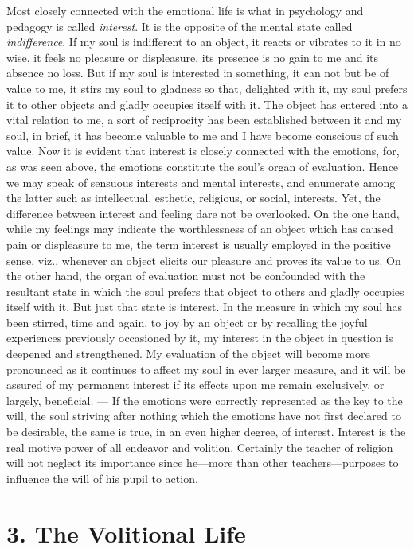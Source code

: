 Most closely connected with the emotional life is what in psychology and pedagogy is called \emph{interest}. It is the opposite of the mental state called \emph{indifference}. If my soul is indifferent to an object, it reacts or vibrates to it in no wise, it feels no pleasure or displeasure, its presence is no gain to me and its absence no loss. But if my soul is interested in something, it can not but be of value to me, it stirs my soul to gladness so that, delighted with it, my soul prefers it to other objects and gladly occupies itself with it. The object has entered into a vital relation to me, a sort of reciprocity has been established between it and my soul, in brief, it has become valuable to me and I have become conscious of such value. Now it is evident that interest is closely
connected with the emotions, for, as was seen above, the emotions constitute the soul’s organ of evaluation. Hence we may speak of sensuous interests and mental interests, and enumerate among the latter such as intellectual, esthetic, religious, or social, interests. Yet, the difference between interest and feeling dare not be overlooked. On the one hand, while my feelings may indicate the worthlessness of an object which has caused pain or displeasure to me, the term interest is usually employed in the positive sense, viz., whenever an object elicits our pleasure and proves its value to us. On the other hand, the organ of evaluation must not be confounded with the resultant state in which the soul prefers that object to others and gladly occupies itself with it. But just that state is interest. In the measure in which my soul has been stirred, time and again, to joy by an object or by recalling the joyful experiences previously occasioned by it, my interest in the object in question is deepened and strengthened. My evaluation of the object will become more pronounced as it continues to affect my soul in ever larger measure, and it will be assured of my permanent interest if its effects upon me remain exclusively, or largely, beneficial. — If the emotions were correctly represented as the key to the will, the soul striving after nothing which the emotions have not first declared to be desirable, the same is true, in an even higher degree, of interest. Interest is the real motive power of all endeavor and volition. Certainly the teacher of religion will not neglect its importance since he—more than other teachers—purposes to influence the will of his pupil to action.

\section{3. The Volitional Life}

